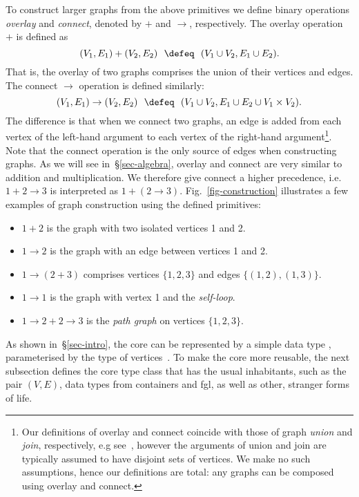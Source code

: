 To construct larger graphs from the above primitives we define binary
operations \emph{overlay} and \emph{connect}, denoted by $+$ and $\rightarrow$,
respectively. The overlay operation $+$ is defined as
\[
(V_1, E_1) + (V_2, E_2)~~\defeq~~(V_1 \cup V_2, E_1 \cup E_2).
\]
That is, the overlay of two graphs comprises the union of their vertices and edges.
The connect $\rightarrow$ operation is defined similarly:
\[
(V_1, E_1) \rightarrow (V_2, E_2)~~\defeq~~(V_1 \cup V_2, E_1 \cup E_2 \cup V_1 \times V_2).
\]
The difference is that when we connect two graphs, an edge is added from each
vertex of the left-hand argument to each vertex of the right-hand
argument\footnote{Our definitions of overlay and connect coincide
with those of graph \emph{union} and \emph{join}, respectively,
e.g see~\citet{1969_graph_theory_harary},
however the arguments of union and join are typically assumed to have disjoint
sets of vertices. We make no such assumptions, hence our definitions are total:
any graphs can be composed using overlay and connect.}.
Note that the connect operation is the only source of edges when constructing
graphs. As we will see in~\S\ref{sec-algebra}, overlay and connect
are very similar to addition and multiplication. We therefore give connect a higher
precedence, i.e. $1 + 2 \rightarrow 3$ is interpreted as $1 + (2 \rightarrow 3)$.
Fig.~\ref{fig-construction} illustrates a few examples of graph construction
using the defined primitives:
\begin{itemize}
  \item $1 + 2$ is the graph with two isolated vertices 1 and 2.
  \item $1 \rightarrow 2$ is the graph with an edge between vertices 1 and 2.
  \item $1 \rightarrow (2 + 3)$ comprises vertices $\{1, 2, 3\}$
  and edges $\{(1, 2), (1, 3)\}$.
  \item $1 \rightarrow 1$ is the graph with vertex 1 and the \emph{self-loop}.
  \item $1 \rightarrow 2 + 2 \rightarrow 3$ is the \emph{path graph} on vertices $\{1, 2, 3\}$.
\end{itemize}

As shown in~\S\ref{sec-intro}, the core can be represented by a simple
data type , parameterised by the type of vertices~.
To make the core more reusable, the next subsection defines the core type class that
has the usual inhabitants, such as the pair $(V,E)$, data types from
\textsf{containers} and \textsf{fgl}, as well as other, stranger forms of life.


